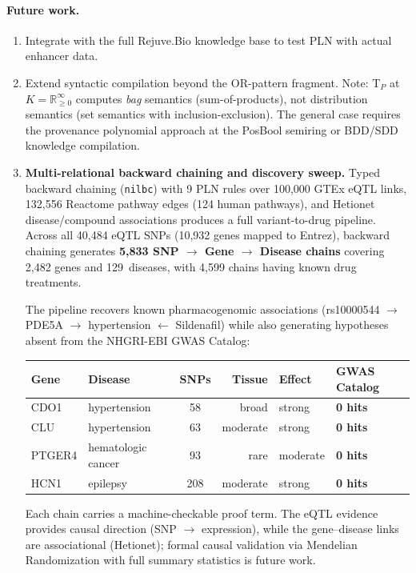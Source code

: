 \documentclass[]{article}
\newcommand{\code}[1]{\texttt{#1}}
\begin{document}
\paragraph{Future work.}
\begin{enumerate}
\item Integrate with the full Rejuve.Bio knowledge base to test PLN with actual
  enhancer data.
\item Extend syntactic compilation beyond the OR-pattern fragment.  Note:
  T$_P$ at $K = \mathbb{R}_{\ge 0}^{\infty}$ computes \emph{bag} semantics
  (sum-of-products), not distribution semantics (set semantics with inclusion-exclusion).
  The general case requires the provenance polynomial approach at the PosBool semiring
  or BDD/SDD knowledge compilation.
\item \textbf{Multi-relational backward chaining and discovery sweep.}
  Typed backward chaining (\code{nilbc}) with 9 PLN rules over
  100{,}000 GTEx eQTL links, 132{,}556 Reactome pathway edges
  (124 human pathways), and Hetionet~\cite{Himmelstein2017}
  disease/compound associations produces a full variant-to-drug
  pipeline.  Across all 40{,}484 eQTL SNPs (10{,}932 genes mapped
  to Entrez), backward chaining generates \textbf{5{,}833 SNP $\to$
  Gene $\to$ Disease chains} covering 2{,}482 genes and
  129~diseases, with 4{,}599 chains having known drug treatments.

  The pipeline recovers known pharmacogenomic associations
  (rs10000544 $\to$ PDE5A $\to$ hypertension $\leftarrow$
  Sildenafil) while also generating hypotheses absent from the
  NHGRI-EBI GWAS Catalog:

  \begin{center}
  \small
  \begin{tabular}{llcrll}
  \toprule
  Gene & Disease & SNPs & Tissue & Effect & GWAS Catalog \\
  \midrule
  CDO1   & hypertension      & 58  & broad    & strong & \textbf{0 hits} \\
  CLU    & hypertension      & 63  & moderate & strong & \textbf{0 hits} \\
  PTGER4 & hematologic cancer & 93 & rare     & moderate & \textbf{0 hits} \\
  HCN1   & epilepsy          & 208 & moderate & strong & \textbf{0 hits} \\
  \bottomrule
  \end{tabular}
  \end{center}

  Each chain carries a machine-checkable proof term. The
  eQTL evidence provides causal direction (SNP $\to$
  expression), while the gene--disease links are associational
  (Hetionet); formal causal validation via Mendelian
  Randomization with full summary statistics is future work.


\end{enumerate}
\end{document}
